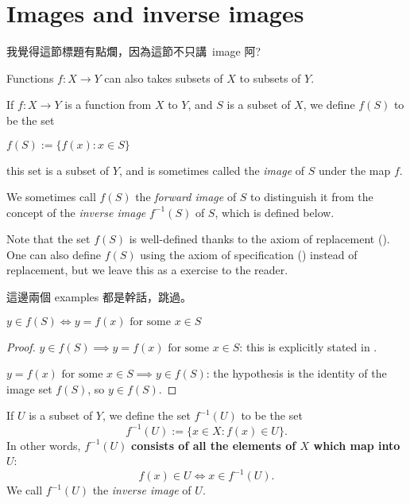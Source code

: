 \section{Images and inverse images}

\begin{note}
我覺得這節標題有點爛，因為這節不只講\ image 阿?
\end{note}

Functions \(f : X \rightarrow Y\) can also takes subsets of \(X\) to subsets of \(Y\).

\begin{definition}  \label{def 3.4.1}
If \(f : X \rightarrow Y\) is a function from \(X\) to \(Y\), and \(S\) is a subset of \(X\), we define \(f(S)\) to be the set
\begin{center}
    \(f(S) := \{ f(x): x \in S \} \)
\end{center}
this set is a subset of \(Y\), and is sometimes called the \emph{image} of \(S\) under the map \(f\).
\end{definition}

We sometimes call \(f(S)\) the \emph{forward image} of \(S\) to distinguish it from the concept of the \emph{inverse image} \(f^{-1}(S)\) of \(S\), which is defined below.

Note that the set \(f(S)\) is well-defined thanks to the axiom of replacement (). One can also define \(f(S)\) using the axiom of specification () instead of replacement, but we leave this as a
exercise to the reader.

\begin{note}
這邊兩個 examples 都是幹話，跳過。
\end{note}

\begin{additional corollary}
\(y \in f(S) \iff y = f(x) \text{\ for some\ } x \in S\)
\end{additional corollary}

\begin{proof}

\(y \in f(S) \implies y = f(x) \text{\ for some\ } x \in S\): this is explicitly stated in .

\(y = f(x) \text{\ for some\ } x \in S \implies y \in f(S)\): the hypothesis is the identity of the image set \(f(S)\), so \(y \in f(S)\).
\end{proof}

\setcounter{theorem}{3}
\begin{definition} \label{def 3.4.4}
If \(U\) is a subset of \(Y\), we define the set \(f^{-1}(U)\) to be the set
\[
    f^{-1}(U) := \{x \in X : f(x) \in U\}.
\]
In other words, \(f^{-1}(U)\) \textbf{consists of all the elements of \(X\) which map into \(U\)}:
\[
    f(x) \in U \iff x \in f^{-1}(U).
\]
We call \(f^{-1}(U)\) the \emph{inverse image} of \(U\).
\end{definition}

